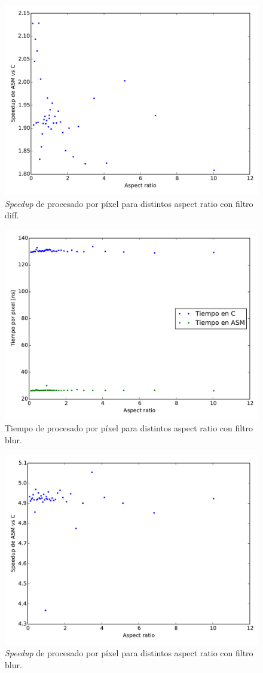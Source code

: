 \begin{figure}
  \centering
  \includegraphics[width=0.7\columnwidth]{speedup_ratio_diff.pdf}
  \caption{\emph{Speedup} de procesado por píxel para distintos aspect
    ratio con filtro diff.}
  \label{fig:speedup_ratio_diff}
\end{figure}

\begin{figure}
  \centering
  \includegraphics[width=0.7\columnwidth]{tiempo_ratio_blur.pdf}
  \caption{Tiempo de procesado por píxel para distintos aspect ratio
    con filtro blur.}
  \label{fig:tiempo_ratio_blur}
\end{figure}

\begin{figure}
  \centering
  \includegraphics[width=0.7\columnwidth]{speedup_ratio_blur.pdf}
  \caption{\emph{Speedup} de procesado por píxel para distintos aspect ratio
    con filtro blur.}
  \label{fig:speedup_ratio_blur}
\end{figure}

